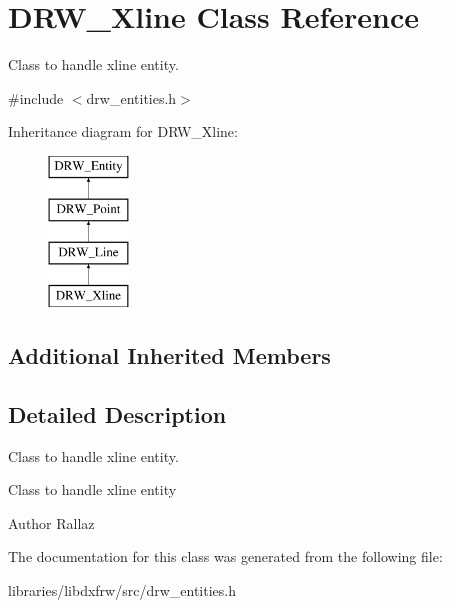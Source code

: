 \hypertarget{classDRW__Xline}{\section{D\-R\-W\-\_\-\-Xline Class Reference}
\label{classDRW__Xline}
}


Class to handle xline entity.  




{\ttfamily \#include $<$drw\-\_\-entities.\-h$>$}

Inheritance diagram for D\-R\-W\-\_\-\-Xline\-:\begin{figure}[H]
\begin{center}
\leavevmode
\includegraphics[height=4.000000cm]{classDRW__Xline}
\end{center}
\end{figure}
\subsection*{Additional Inherited Members}


\subsection{Detailed Description}
Class to handle xline entity. 

Class to handle xline entity \begin{DoxyAuthor}{Author}
Rallaz 
\end{DoxyAuthor}


The documentation for this class was generated from the following file\-:\begin{DoxyCompactItemize}
\item 
libraries/libdxfrw/src/drw\-\_\-entities.\-h\end{DoxyCompactItemize}
